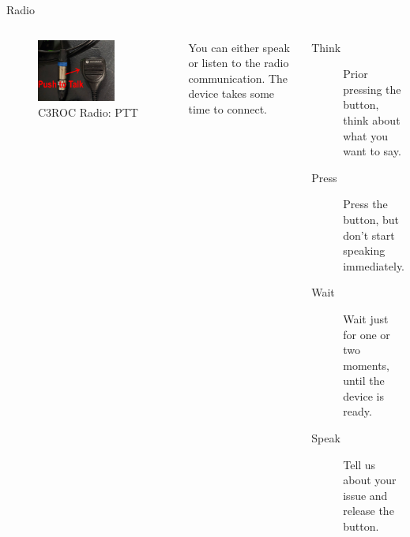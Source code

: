 \documentclass[aspectratio=169]{beamer}
\begin{document}
\begin{frame}{Radio}
	\begin{columns}[T,onlytextwidth]
		\begin{figure} 
			\centering
			\includegraphics[width=0.75\textwidth]{images/radio_ptt.png}
			\caption{C3ROC Radio: PTT}
		\end{figure}
		You can either speak or listen to the radio communication. The device takes some time to connect.
		\begin{description}
			\item[Think] Prior pressing the button, think about what you want to say.
			\item[Press] Press the button, but don't start speaking immediately.
			\item[Wait] Wait just for one or two moments, until the device is ready.
			\item[Speak] Tell us about your issue and release the button.
		\end{description}
		\end{columns}
\end{frame}
\end{document}
